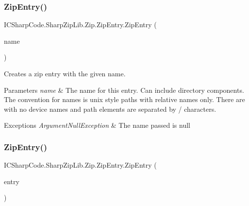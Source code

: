 \subsubsection{\texorpdfstring{Zip\+Entry()}{ZipEntry()}\hspace{0.1cm}{\footnotesize\ttfamily [1/4]}}
{\footnotesize\ttfamily I\+C\+Sharp\+Code.\+Sharp\+Zip\+Lib.\+Zip.\+Zip\+Entry.\+Zip\+Entry (\begin{DoxyParamCaption}\item[{string}]{name }\end{DoxyParamCaption})\hspace{0.3cm}{\ttfamily [inline]}}



Creates a zip entry with the given name. 


\begin{DoxyParams}{Parameters}
{\em name} & The name for this entry. Can include directory components. The convention for names is \textquotesingle{}unix\textquotesingle{} style paths with relative names only. There are with no device names and path elements are separated by \textquotesingle{}/\textquotesingle{} characters. \\
\hline
\end{DoxyParams}

\begin{DoxyExceptions}{Exceptions}
{\em Argument\+Null\+Exception} & The name passed is null \\
\hline
\end{DoxyExceptions}
\mbox{\label{class_i_c_sharp_code_1_1_sharp_zip_lib_1_1_zip_1_1_zip_entry_a6bbb789c245e55161cbfb08d0754b126}} 
\subsubsection{\texorpdfstring{Zip\+Entry()}{ZipEntry()}\hspace{0.1cm}{\footnotesize\ttfamily [2/4]}}
{\footnotesize\ttfamily I\+C\+Sharp\+Code.\+Sharp\+Zip\+Lib.\+Zip.\+Zip\+Entry.\+Zip\+Entry (\begin{DoxyParamCaption}\item[{\hyperlink{class_i_c_sharp_code_1_1_sharp_zip_lib_1_1_zip_1_1_zip_entry}{Zip\+Entry}}]{entry }\end{DoxyParamCaption})\hspace{0.3cm}{\ttfamily [inline]}}



